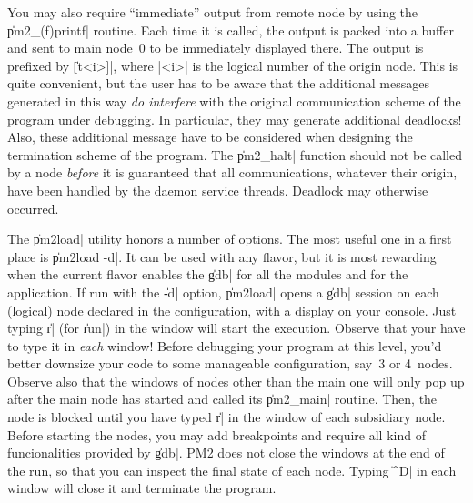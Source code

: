 You may also require ``immediate'' output from remote node by using
the \|pm2_(f)printf| routine. Each time it is called, the output is
packed into a buffer and sent to main node~0 to be immediately
displayed there. The output is prefixed by \|[t<i>]|, where |<i>| is
the logical number of the origin node.  This is quite convenient, but
the user has to be aware that the additional messages generated in
this way \emph{do interfere} with the original communication scheme of
the program under debugging. In particular, they may generate
additional deadlocks! Also, these additional message have to be
considered when designing the termination scheme of the program. The
\|pm2_halt| function should not be called by a node \emph{before} it
is guaranteed that all communications, whatever their origin, have
been handled by the daemon service threads. Deadlock may otherwise
occurred.

The \|pm2load| utility honors a number of options.  The most useful
one in a first place is \|pm2load -d|. It can be used with any flavor,
but it is most rewarding when the current flavor enables the \|gdb|
for all the modules and for the application. If run with the \|-d|
option, \|pm2load| opens a \|gdb| session on each (logical) node
declared in the configuration, with a display on your console. Just
typing \|r| (for \|run|) in the window will start the execution.
Observe that your have to type it in \emph{each} window!  Before
debugging your program at this level, you'd better downsize your code
to some manageable configuration, say~3 or 4~nodes. Observe also that
the windows of nodes other than the main one will only pop up after
the main node has started and called its \|pm2_main| routine. Then,
the node is blocked until you have typed \|r| in the window of each
subsidiary node. Before starting the nodes, you may add breakpoints
and require all kind of funcionalities provided by \|gdb|.  PM2 does
not close the windows at the end of the run, so that you can inspect
the final state of each node. Typing \|^D| in each window will close
it and terminate the program.


